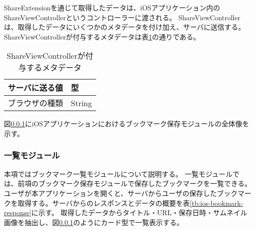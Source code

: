 ShareExtensionを通じて取得したデータは、iOSアプリケーション内のShareViewControllerというコントローラーに渡される。
ShareViewControllerは、取得したデータにいくつかのメタデータを付け加え、サーバに送信する。
ShareViewControllerが付与するメタデータは表\ref{tb:ios-meta-data}の通りである。

\begin{table}[htbp]
  \label{tb:ios-meta-data}
  \caption{ShareViewControllerが付与するメタデータ}
  \begin{center}
    \begin{tabular}{|l|l|}
    \hline
    サーバに送る値 & 型 \\ \hline
    ブラウザの種類 & String \\ \hline
    \end{tabular}
  \end{center}
\end{table}

図\ref{}にiOSアプリケーションにおけるブックマーク保存モジュールの全体像を示す。

\subsubsection{一覧モジュール}
本項ではブックマーク一覧モジュールについて説明する。
一覧モジュールでは、前項のブックマーク保存モジュールで保存したブックマークを一覧できる。
ユーザが本アプリケーションを開くと、サーバからユーザの保存したブックマークを取得する。サーバからのレスポンスとデータの概要を表\ref{tb:ios-bookmark-response}に示す。
取得したデータからタイトル・URL・保存日時・サムネイル画像を抽出し、図\ref{}のようにカード型で一覧表示する。

